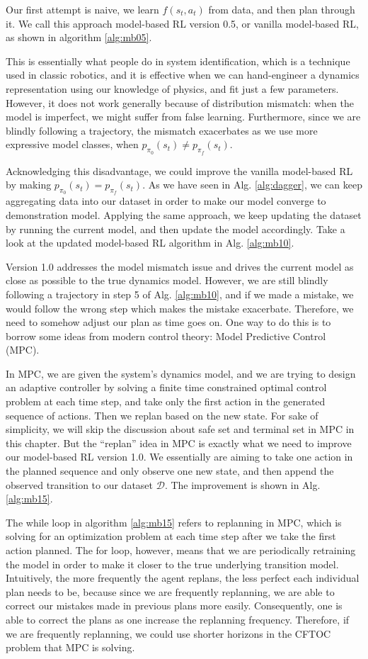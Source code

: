 Our first attempt is naive, we learn $f(s_t,a_t)$ from data, and then plan through it. We call this approach model-based RL version 0.5, or vanilla model-based RL, as shown in algorithm \ref{alg:mb05}.

This is essentially what people do in system identification, which is a technique used in classic robotics, and it is effective when we can hand-engineer a dynamics representation using our knowledge of physics, and fit just a few parameters. However, it does not work generally because of distribution mismatch: when the model is imperfect, we might suffer from false learning. Furthermore, since we are blindly following a trajectory, the mismatch exacerbates as we use more expressive model classes, when $p_{\pi_0}(s_t)\neq p_{\pi_f}(s_t)$.

Acknowledging this disadvantage, we could improve the vanilla model-based RL by making $p_{\pi_0}(s_t) = p_{\pi_f}(s_t)$. As we have seen in Alg. \ref{alg:dagger}, we can keep aggregating data into our dataset in order to make our model converge to demonstration model. Applying the same approach, we keep updating the dataset by running the current model, and then update the model accordingly. Take a look at the updated model-based RL algorithm in Alg. \ref{alg:mb10}.

Version 1.0 addresses the model mismatch issue and drives the current model as close as possible to the true dynamics model. However, we are still blindly following a trajectory in step 5 of Alg. \ref{alg:mb10}, and if we made a mistake, we would follow the wrong step which makes the mistake exacerbate. Therefore, we need to somehow adjust our plan as time goes on. One way to do this is to borrow some ideas from modern control theory: Model Predictive Control (MPC).

In MPC, we are given the system's dynamics model, and we are trying to design an adaptive controller by solving a finite time constrained optimal control problem at each time step, and take only the first action in the generated sequence of actions. Then we replan based on the new state. For sake of simplicity, we will skip the discussion about safe set and terminal set in MPC in this chapter. But the ``replan'' idea in MPC is exactly what we need to improve our model-based RL version 1.0. We essentially are aiming to take one action in the planned sequence and only observe one new state, and then append the observed transition to our dataset $\mathcal{D}$. The improvement is shown in Alg. \ref{alg:mb15}.

The while loop in algorithm \ref{alg:mb15} refers to replanning in MPC, which is solving for an optimization problem at each time step after we take the first action planned. The for loop, however, means that we are periodically retraining the model in order to make it closer to the true underlying transition model. Intuitively, the more frequently the agent replans, the less perfect each individual plan needs to be, because since we are frequently replanning, we are able to correct our mistakes made in previous plans more easily. Consequently, one is able to correct the plans as one increase the replanning frequency. Therefore, if we are frequently replanning, we could use shorter horizons in the CFTOC problem that MPC is solving. 

